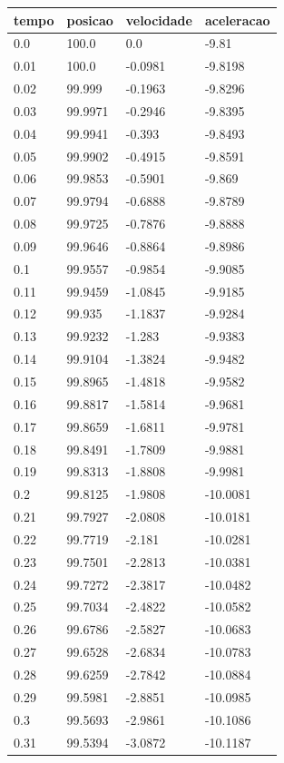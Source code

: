 \begin{tabular}{llll}
\toprule
tempo & posicao & velocidade & aceleracao \\
\midrule
0.0 & 100.0 & 0.0 & -9.81 \\
0.01 & 100.0 & -0.0981 & -9.8198 \\
0.02 & 99.999 & -0.1963 & -9.8296 \\
0.03 & 99.9971 & -0.2946 & -9.8395 \\
0.04 & 99.9941 & -0.393 & -9.8493 \\
0.05 & 99.9902 & -0.4915 & -9.8591 \\
0.06 & 99.9853 & -0.5901 & -9.869 \\
0.07 & 99.9794 & -0.6888 & -9.8789 \\
0.08 & 99.9725 & -0.7876 & -9.8888 \\
0.09 & 99.9646 & -0.8864 & -9.8986 \\
0.1 & 99.9557 & -0.9854 & -9.9085 \\
0.11 & 99.9459 & -1.0845 & -9.9185 \\
0.12 & 99.935 & -1.1837 & -9.9284 \\
0.13 & 99.9232 & -1.283 & -9.9383 \\
0.14 & 99.9104 & -1.3824 & -9.9482 \\
0.15 & 99.8965 & -1.4818 & -9.9582 \\
0.16 & 99.8817 & -1.5814 & -9.9681 \\
0.17 & 99.8659 & -1.6811 & -9.9781 \\
0.18 & 99.8491 & -1.7809 & -9.9881 \\
0.19 & 99.8313 & -1.8808 & -9.9981 \\
0.2 & 99.8125 & -1.9808 & -10.0081 \\
0.21 & 99.7927 & -2.0808 & -10.0181 \\
0.22 & 99.7719 & -2.181 & -10.0281 \\
0.23 & 99.7501 & -2.2813 & -10.0381 \\
0.24 & 99.7272 & -2.3817 & -10.0482 \\
0.25 & 99.7034 & -2.4822 & -10.0582 \\
0.26 & 99.6786 & -2.5827 & -10.0683 \\
0.27 & 99.6528 & -2.6834 & -10.0783 \\
0.28 & 99.6259 & -2.7842 & -10.0884 \\
0.29 & 99.5981 & -2.8851 & -10.0985 \\
0.3 & 99.5693 & -2.9861 & -10.1086 \\
0.31 & 99.5394 & -3.0872 & -10.1187 \\

\end{tabular}
